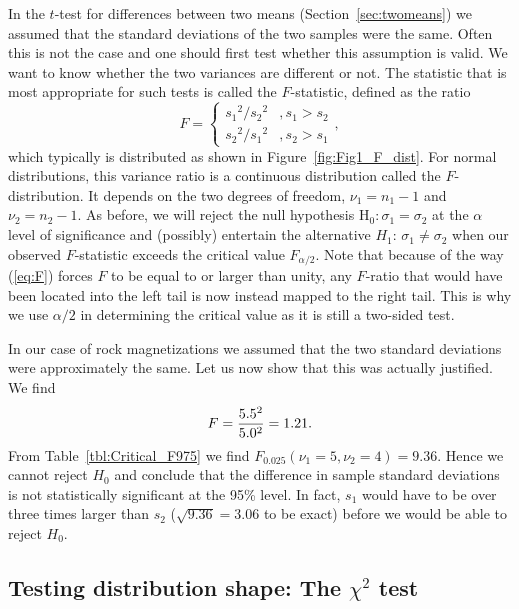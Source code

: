 	In the $t$-test for differences between two means (Section~\ref{sec:twomeans})
we assumed that the standard deviations of the two samples were the same.
Often this is not the case  and one should first test whether this 
assumption is valid.  We want to know whether the two variances are different or not.  The 
statistic that is most appropriate for such tests is called the $F$-statistic, defined as the ratio
\begin{equation}
F=\left \{ \begin{array}{cc}{s_1}^2/{s_2}^2 & ,s_1>s_2\\
{s_2}^2/{s_1}^2 & ,s_2>s_1
\end{array}\right.,
\label{eq:F}
\end{equation}
which typically is distributed as shown in Figure~\ref{fig:Fig1_F_dist}.
For normal distributions, this variance ratio is a continuous distribution called the $F$-distribution.  
It depends on the two degrees of freedom, $\nu_1 = n_1 - 1$ and $\nu_2 = n_2 - 1$.  As before, we will reject 
the null hypothesis H$_0:\sigma_1 = \sigma_2$ at the $\alpha$ level of significance and (possibly) entertain the alternative 
$H_1$: $\sigma_1 \neq \sigma_2$  when our observed $F$-statistic exceeds the critical value $F_{\alpha/2}$.
Note that because of the way (\ref{eq:F}) forces $F$ to be equal to or larger than unity, any $F$-ratio that would
have been located into the left tail is now instead mapped to the right tail.  This is why we use $\alpha/2$ in determining
the critical value as it is still a two-sided test.
\begin{example}
In our case of rock magnetizations we assumed that the two standard deviations were approximately 
the same.  Let us now show that this was actually justified.  We find
\begin{equation}
	\index{\emph{F}-test}
	\index{F-test}
	\index{Test!\emph{F}}
F=\frac{5.5^2}{5.0^2}=1.21.
\end{equation}	 
From Table~\ref{tbl:Critical_F975} we find $F_{0.025}(\nu_1 = 5, \nu _2 = 4) = 9.36$. Hence we cannot reject $H_0$ and conclude 
that the difference in sample standard deviations is not statistically significant at the 95\% level.  In fact, $s_1$ would
have to be over three times larger than $s_2$ ($\sqrt{9.36} = 3.06$ to be exact) before we would be able to reject $H_0$.
\end{example}

\subsection{Testing distribution shape: The $\chi^2$ test}

